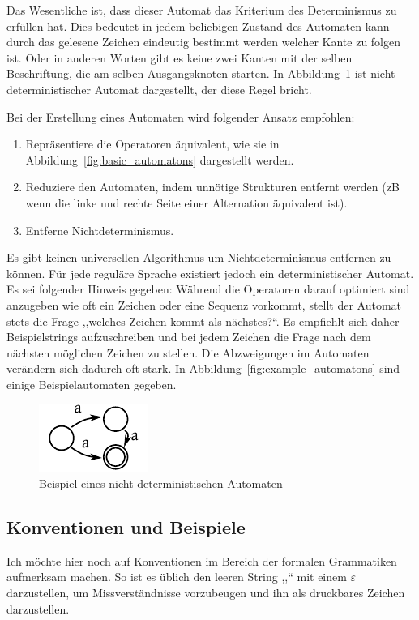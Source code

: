 Das Wesentliche ist, dass dieser Automat das Kriterium des Determinismus zu erfüllen hat. Dies bedeutet in jedem beliebigen Zustand des Automaten kann durch das gelesene Zeichen eindeutig bestimmt werden welcher Kante zu folgen ist. Oder in anderen Worten gibt es keine zwei Kanten mit der selben Beschriftung, die am selben Ausgangsknoten starten. In Abbildung~\ref{fig:nondeterministic_automaton} ist nicht-deterministischer Automat dargestellt, der diese Regel bricht.

Bei der Erstellung eines Automaten wird folgender Ansatz empfohlen:
\begin{enumerate}
  \item Repräsentiere die Operatoren äquivalent, wie sie in Abbildung~\ref{fig:basic_automatons} dargestellt werden.
  \item Reduziere den Automaten, indem unnötige Strukturen entfernt werden (zB wenn die linke und rechte Seite einer Alternation äquivalent ist).
  \item Entferne Nichtdeterminismus.
\end{enumerate}
%
Es gibt keinen universellen Algorithmus um Nichtdeterminismus entfernen zu können. Für jede reguläre Sprache existiert jedoch ein deterministischer Automat. Es sei folgender Hinweis gegeben: Während die Operatoren darauf optimiert sind anzugeben wie oft ein Zeichen oder eine Sequenz vorkommt, stellt der Automat stets die Frage ,,welches Zeichen kommt als nächstes?{}``. Es empfiehlt sich daher Beispielstrings aufzuschreiben und bei jedem Zeichen die Frage nach dem nächsten möglichen Zeichen zu stellen. Die Abzweigungen im Automaten verändern sich dadurch oft stark. In Abbildung~\ref{fig:example_automatons} sind einige Beispielautomaten gegeben.
%
\begin{figure}[hb]
 \begin{center}
  \includegraphics{img/nondeterministic_automaton.pdf}
  \caption{Beispiel eines nicht-deterministischen Automaten}
  \label{fig:nondeterministic_automaton}
 \end{center}
\end{figure}

\subsection{Konventionen und Beispiele}
%
Ich möchte hier noch auf Konventionen im Bereich der formalen Grammatiken aufmerksam machen. So ist es üblich den leeren String ,,`` mit einem $\varepsilon$ darzustellen, um Missverständnisse vorzubeugen und ihn als druckbares Zeichen darzustellen.

